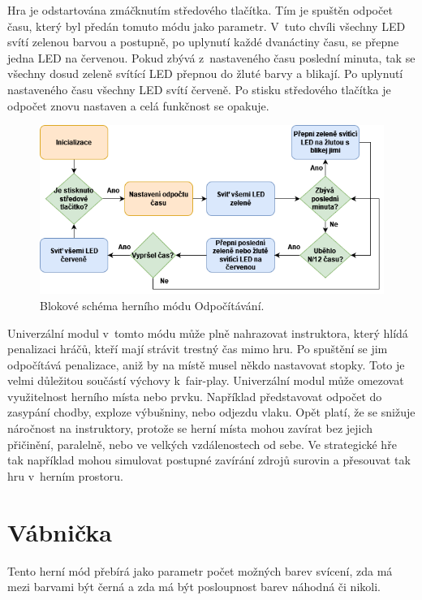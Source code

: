 Hra je odstartována zmáčknutím středového tlačítka. Tím je spuštěn odpočet času, který byl předán tomuto módu jako parametr. V~tuto chvíli všechny LED svítí zelenou barvou a postupně, po uplynutí každé 
dvanáctiny času, se přepne jedna LED na červenou. Pokud zbývá z~nastaveného času poslední minuta, tak se všechny dosud zeleně svítící LED přepnou do žluté barvy a blikají. Po uplynutí nastaveného času 
všechny LED svítí červeně. Po stisku středového tlačítka je odpočet znovu nastaven a celá funkčnost se opakuje.  

\begin{figure}[!h]
  \begin{center}
    \includegraphics[scale=0.65]{obrazky/Odpocitavani_diagram.png}
  \end{center}
  \caption[Blokové schéma herního módu Odpočítávání]{Blokové schéma herního módu Odpočítávání.}
\end{figure}

Univerzální modul v~tomto módu může plně nahrazovat instruktora, který hlídá penalizaci hráčů, kteří mají strávit trestný čas mimo hru. Po spuštění se jim odpočítává penalizace, aniž by na místě musel 
někdo nastavovat stopky. Toto je velmi důležitou součástí výchovy k~fair-play. Univerzální modul může omezovat využitelnost herního místa nebo prvku. Například představovat odpočet do zasypání chodby, 
exploze výbušniny, nebo odjezdu vlaku. Opět platí, že se snižuje náročnost na instruktory, protože se herní místa mohou zavírat bez jejich přičinění, paralelně, nebo ve velkých vzdálenostech od sebe. 
Ve strategické hře tak například mohou simulovat postupné zavírání zdrojů surovin a přesouvat tak hru v~herním prostoru.

\section{Vábnička}
Tento herní mód přebírá jako parametr počet možných barev svícení, zda má mezi barvami být černá a zda má být posloupnost barev náhodná či nikoli.

